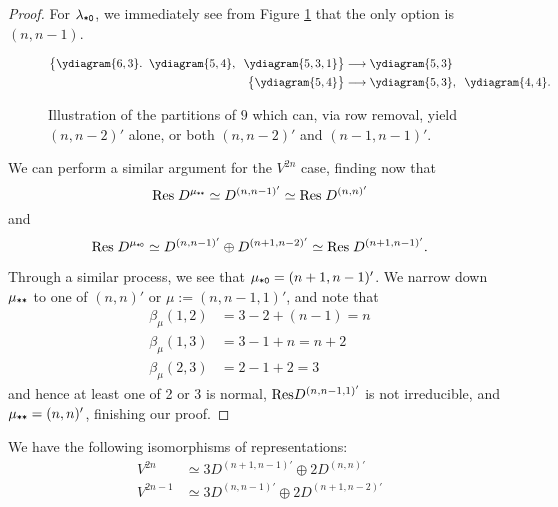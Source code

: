 \documentclass{amsart}
\begin{document}
\begin{proof}
  For $\lambda_{\texttt{*}\texttt{0}}$, we immediately see from Figure \ref{OddRes} that the only option is $(n,n-1)$.
  \begin{figure}
    \begin{align*}
      \cbr{
        \begin{gathered}
        \ydiagram{6,3}. \; \;
        \ydiagram{5,4}, \; \;
        \ydiagram{5,3,1}
      \end{gathered} 
    }&\longrightarrow \begin{gathered}
      \ydiagram{5,3}
      \end{gathered}\\
      \cbr{
        \begin{gathered}
          \ydiagram{5,4}
        \end{gathered}
      }&\longrightarrow
      \begin{gathered}
        \ydiagram{5,3},\;\;
        \ydiagram{4,4}.
      \end{gathered}
    \end{align*}
    \caption{
      Illustration of the partitions of $9$ which can, via row removal, yield $(n,n-2)'$ alone, or both $(n,n-2)'$ and $(n-1,n-1)'$.
    }\label{OddRes}
  \end{figure}  
  
  We can perform a similar argument for the $V^{2n}$ case, finding now that 
  \[\text{Res} \; D^{\mu_{\texttt{*}\texttt{*}}} \simeq D^{(n,n-1)'} \simeq \text{Res} \; D^{(n,n)'}\] and 
  \[\text{Res} \; D^{\mu_{\texttt{*}\texttt{0}}} \simeq D^{(n,n-1)'} \oplus D^{(n+1,n-2)'} \simeq \text{Res} \; D^{(n+1,n-1)'}.\]
  
  Through a similar process, we see that $\mu_{\texttt{*}\texttt{0}} = (n+1,n-1)'$.
  We narrow down $\mu_{\texttt{*}\texttt{*}}$ to one of $(n,n)'$ or $\mu := (n,n-1,1)'$, and note that
  \begin{align*} 
    \beta_\mu(1,2) &= 3 - 2 + (n-1) = n\\
    \beta_\mu(1,3) &= 3 - 1 + n = n+2\\
    \beta_\mu(2,3) &= 2 - 1 + 2 = 3
  \end{align*}
  and hence at least one of 2 or 3 is normal, $\text{Res} D^{(n,n-1,1)'}$ is not irreducible, and $\mu_{\texttt{*}\texttt{*}} = (n,n)'$, finishing our proof.
\end{proof}
\begin{corollary}
  We have the following isomorphisms of representations:
  \begin{align*} 
    V^{2n} &\simeq 3D^{(n+1,n-1)'} \oplus 2D^{(n,n)'}\\
    V^{2n - 1} &\simeq 3D^{(n,n-1)'} \oplus 2D^{(n+1,n-2)'}
  \end{align*}
\end{corollary}
\end{document}
